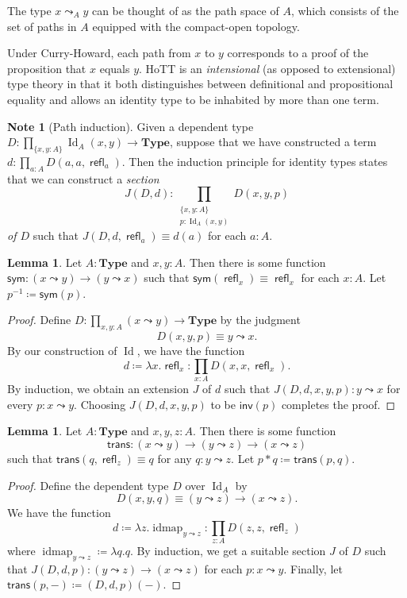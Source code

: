 \documentclass[10pt,letterpaper,cm]{nupset}
\theoremstyle{definition}
\newtheorem{note}[definition]{Note}
\theoremstyle{theorem}
\newtheorem{lemma}[definition]{Lemma}
\theoremstyle{remark}
\newcommand{\1}{\mathbf{1}}
\newcommand{\0}{\vec 0}
\DeclareMathOperator{\id}{Id}
\DeclareMathOperator{\idmap}{idmap}
\DeclareMathOperator{\refl}{\mathsf{refl}}
\begin{document}
\smallskip

The type $x \leadsto_A y$ can be thought of as the path space of $A$, which consists of the set of paths in $A$ equipped with the compact-open topology. 


\medskip

Under Curry-Howard, each path from $x$ to $y$ corresponds to a proof of the proposition that $x$ equals $y$. HoTT is an \emph{intensional} (as opposed to extensional) type theory in that it both distinguishes between definitional and propositional equality and allows an identity type to be inhabited by more than one term.

\medskip

\begin{note}[Path induction]
Given a dependent type $D: \prod_{\{x,y:A\}}\id_A(x,y) \to \mathbf{Type}$, suppose that we have constructed a term $d: \prod_{a:A} D(a,a, \refl_a)$. Then the induction principle for identity types states that we can construct a \textit{section}  $$J(D, d)  :  \prod_{\substack{\{x,y:A\} \\ p: \id_A(x,y)}} D(x,y,p) $$  \textit{of $D$} such that $J(D, d, \refl_a) \equiv d(a)$ for each $a: A$.
\end{note}

\begin{lemma}
Let $A: \mathbf{Type}$ and $x,y: A$. Then there is some function $\mathsf{sym}:(x\leadsto y) \to (y \leadsto x)$ such that $\mathsf{sym} (\refl_x) \equiv \refl_x$ for each $x:A$. Let $p^{{-}1} \coloneqq \mathsf{sym}(p)$.
\end{lemma}
\begin{proof}
Define $D: \prod_{x,y:A}(x\leadsto y) \to \mathbf{Type}$ by the judgment $$D(x,y,p) \equiv y \leadsto x .$$ By our construction of $\id$, we have the function $$d\coloneqq \lambda x. \refl_x : \prod_{x:A}D(x,x,\refl_x).$$ By induction, we obtain an extension $J$ of $d$ such that $J(D, d, x, y, p) : y \leadsto x$ for every $p: x \leadsto y$. Choosing $J(D, d,x,y,p)$ to be $\mathsf{inv}(p) $ completes the proof.
\end{proof}

\begin{lemma}
Let $A: \mathbf{Type}$ and $x,y,z: A$. Then there is some function $$\mathsf{trans} : (x\leadsto y) \to (y \leadsto z) \to (x \leadsto z)$$ such that $\mathsf{trans}(q, \refl_z) \equiv q$ for any $q: y \leadsto z$. Let $p \ast q \coloneqq \mathsf{trans}(p,q)$.
\end{lemma}
\begin{proof}
Define the dependent type $D$ over $\id_A$ by $$D(x, y, q) \equiv (y \leadsto z) \to (x \leadsto z).$$ We have the function $$d \coloneqq\lambda z.\idmap_{y\leadsto z} : \prod_{z: A} D(z, z, \refl_z)$$ where $\idmap_{y\leadsto z} \coloneqq \lambda q.q$. By induction, we get a suitable section $J$ of $D$ such that $J(D, d, p) : (y \leadsto z) \to (x\leadsto z)$ for each $p: x\leadsto y$.  Finally, let $\mathsf{trans}(p, -) \coloneqq (D, d, p)(-)$.
\end{proof}
\end{document}
